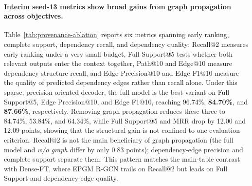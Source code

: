\paragraph{Interim seed-13 metrics show broad gains from graph propagation
across objectives.}
Table~\ref{tab:provenance-ablation} reports six metrics spanning early
ranking, complete support, dependency recall, and dependency quality:
Recall@2 measures early ranking under a very small budget, Full Support@5
tests whether both relevant outputs enter the context together, Path@10
and Edge@10 measure dependency-structure recall, and Edge Precision@10 and
Edge F1@10 measure the quality of predicted dependency edges rather than
recall alone. Under this sparse, precision-oriented decoder, the full model is the best
variant on Full Support@5, Edge Precision@10, and Edge F1@10, reaching
96.74\%, \textbf{84.70\%}, and \textbf{87.66\%}, respectively. Removing
graph propagation reduces these three to 84.74\%, 53.84\%, and 64.34\%,
while Full Support@5 and MRR drop by 12.00 and 12.09 points, showing that
the structural gain is not confined to one evaluation criterion. Recall@2 is not the main beneficiary of graph
propagation (the full model and \emph{w/o graph} differ by only 0.83
points); dependency-edge precision and complete support separate them.
This pattern matches the main-table contrast with Dense-FT, where EPGM
R-GCN trails on Recall@2 but leads on Full Support and dependency-edge
quality.

\begin{table}[t]
\centering
\small
\setlength{\tabcolsep}{3.5pt}
\caption{Interim seed-13 EPGM R-GCN component ablations on the synthetic
2Wiki execution-provenance benchmark (\%). EdgeP@10 and EdgeF1@10 are
Edge Precision@10 and Edge F1@10. Rows share the main-table full-model
protocol; final claims will use Table~\ref{tab:provenance-three-seed}.}
\label{tab:provenance-ablation}
\end{table}

